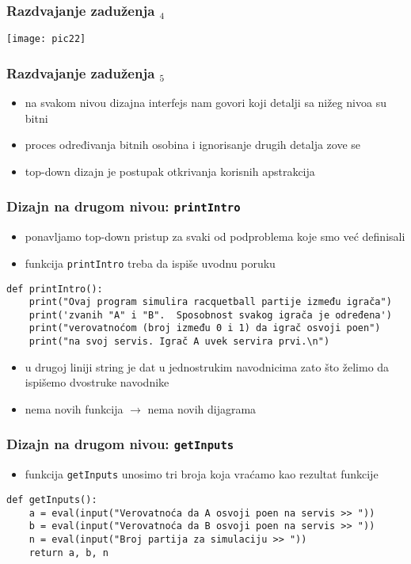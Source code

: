 \documentclass[utf8,compress,aspectratio=169]{beamer}
\begin{document}
\begin{frame}
  \frametitle{Razdvajanje zaduženja $_4$}
  \begin{center}
    \texttt{[image: pic22]}
  \end{center}
\end{frame}

\begin{frame}
  \frametitle{Razdvajanje zaduženja $_5$}
  \begin{itemize}
    \item na svakom nivou dizajna interfejs nam govori koji detalji sa nižeg nivoa su bitni
    \item proces određivanja bitnih osobina i ignorisanje drugih detalja zove se 
    \item top-down dizajn je postupak otkrivanja korisnih apstrakcija
  \end{itemize}
\end{frame}

\begin{frame}[fragile,shrink=15]
  \frametitle{Dizajn na drugom nivou: \texttt{printIntro}}
  \begin{itemize}
    \item ponavljamo top-down pristup za svaki od podproblema koje smo već definisali
    \item funkcija \texttt{printIntro} treba da ispiše uvodnu poruku
  \end{itemize}
\begin{verbatim}
def printIntro():
    print("Ovaj program simulira racquetball partije između igrača")
    print('zvanih "A" i "B".  Sposobnost svakog igrača je određena')
    print("verovatnoćom (broj između 0 i 1) da igrač osvoji poen")
    print("na svoj servis. Igrač A uvek servira prvi.\n")
\end{verbatim}
  \begin{itemize}
    \item u drugoj liniji string je dat u jednostrukim navodnicima zato što želimo da ispišemo dvostruke navodnike
    \item nema novih funkcija $\rightarrow$ nema novih dijagrama
  \end{itemize}
\end{frame}

\begin{frame}[fragile,shrink=15]
  \frametitle{Dizajn na drugom nivou: \texttt{getInputs}}
  \begin{itemize}
    \item funkcija \texttt{getInputs} unosimo tri broja koja vraćamo kao rezultat funkcije
  \end{itemize}
\begin{verbatim}
def getInputs():
    a = eval(input("Verovatnoća da A osvoji poen na servis >> "))
    b = eval(input("Verovatnoća da B osvoji poen na servis >> "))
    n = eval(input("Broj partija za simulaciju >> "))
    return a, b, n
\end{verbatim}
\end{frame}
\end{document}
